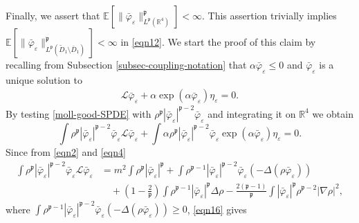 \documentclass{article}
\begin{document}
Finally, we assert that $\mathbb{E} [\| \bar{\varphi}_{\varepsilon}
\|_{L^{\mathfrak{p}}(\mathbb{R}^4)}^{\mathfrak{p}}] <
\infty$. This assertion trivially implies $\mathbb{E} [\| \bar{\varphi}_{\varepsilon}
\|_{L^{\mathfrak{p}} (\tilde{D}_1 \setminus \bar{D}_1)}^{\mathfrak{p}}] <
\infty$ in \eqref{eqn12}. 
% 
We start the proof of this claim by recalling from Subsection
\ref{subsec-coupling-notation} that $\alpha \bar{\varphi}_{\varepsilon}
\leqslant 0$ and $\bar{\varphi}_{\varepsilon}$ is a unique solution to
\begin{equation}
  \begin{array}{l}
    \mathcal{L} \bar{\varphi}_{\varepsilon} + \alpha \exp (\alpha
    \bar{\varphi}_{\varepsilon}) \eta_{\varepsilon} = 0.
  \end{array} \label{moll-good-SPDE}
\end{equation}
By testing \eqref{moll-good-SPDE} with $\rho^{\mathfrak{p}} |
\bar{\varphi}_{\varepsilon} |^{\mathfrak{p}- 2}  \bar{\varphi}_{\varepsilon}$
and integrating it on $\mathbb{R}^4$ we obtain
\begin{equation}
    \int \rho^{\mathfrak{p}} | \bar{\varphi}_{\varepsilon} |^{\mathfrak{p}- 2}
    \bar{\varphi}_{\varepsilon} \mathcal{L} \bar{\varphi}_{\varepsilon} +
    \int \alpha \rho^{\mathfrak{p}} | \bar{\varphi}_{\varepsilon}
    |^{\mathfrak{p}- 2}  \bar{\varphi}_{\varepsilon} \exp (\alpha
    \bar{\varphi}_{\varepsilon}) \eta_{\varepsilon} = 0. \label{eqn16}
\end{equation}
%
Since from \eqref{eqn2} and \eqref{eqn4}
%
\begin{align*}
    \int \rho^{\mathfrak{p}} | \bar{\varphi}_{\varepsilon} |^{\mathfrak{p}-
     2}  \bar{\varphi}_{\varepsilon} \mathcal{L} \bar{\varphi}_{\varepsilon} &
     =  m^2 \int \rho^{\mathfrak{p}} | \bar{\varphi}_{\varepsilon}
     |^{\mathfrak{p}} + \int \rho^{\mathfrak{p}- 1} |
     \bar{\varphi}_{\varepsilon} |^{\mathfrak{p}- 2}
     \bar{\varphi}_{\varepsilon} (- \Delta (\rho
     \bar{\varphi}_{\varepsilon})) \\
     &  \quad  + \left( 1 - \frac{2}{\mathfrak{p}} \right) \int
     \rho^{\mathfrak{p}- 1} | \bar{\varphi}_{\varepsilon} |^{\mathfrak{p}}
     \Delta \rho - \frac{2 (\mathfrak{p}- 1)}{\mathfrak{p}} \int |
     \bar{\varphi}_{\varepsilon} |^{\mathfrak{p}} \rho^{\mathfrak{p}- 2} |
     \nabla \rho |^2, 
\end{align*}
%
where $\int \rho^{\mathfrak{p}- 1} | \bar{\varphi}_{\varepsilon}
|^{\mathfrak{p}- 2} \bar{\varphi}_{\varepsilon} (- \Delta (\rho
\bar{\varphi}_{\varepsilon})) \geq 0$, \eqref{eqn16} gives
\end{document}
